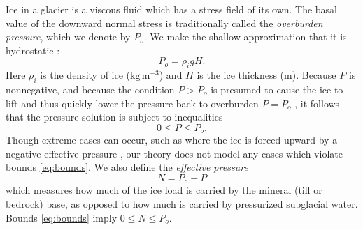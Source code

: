 \documentclass[11pt,final]{amsart}
\begin{document}
Ice in a glacier is a viscous fluid which has a stress field of its own.  The basal value of the downward normal stress is traditionally called the \emph{overburden pressure}, which we denote by $P_o$.  We make the shallow approximation that it is hydrostatic \citep{GreveBlatter2009}:
\begin{equation} \label{eq:hydrostatic}
  P_o = \rho_i g H.
\end{equation}
Here $\rho_i$ is the density of ice ($\text{kg}\,\text{m}^{-3}$) and $H$ is the ice thickness (m).  Because $P$ is nonnegative, and because the condition $P>P_o$ is presumed to cause the ice to lift and thus quickly lower the pressure back to overburden $P=P_o$ \citep{Schoofetal2012}, it follows that the pressure solution is subject to inequalities
\begin{equation}
0 \le P \le P_o. \label{eq:bounds}
\end{equation}
Though extreme cases can occur, such as where the ice is forced upward by a negative effective pressure \citep{Schoofetal2012}, our theory does not model any cases which  violate bounds \eqref{eq:bounds}.  We also define the \emph{effective pressure}
\begin{equation}
N = P_o - P  \label{eq:effective}
\end{equation}
which measures how much of the ice load is carried by the mineral (till or bedrock) base, as opposed to how much is carried by pressurized subglacial water.  Bounds \eqref{eq:bounds} imply $0 \le N \le P_o$.
\end{document}
